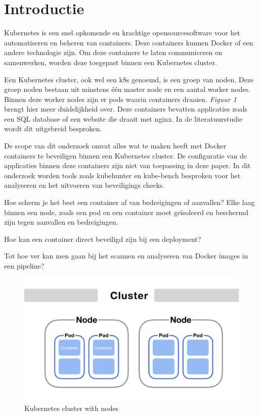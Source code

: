 
\section{Introductie}%
\label{sec:introductie}

Kubernetes is een snel opkomende en krachtige opensourcesoftware voor het automatiseren en beheren van containers. Deze containers kunnen Docker of een andere technologie zijn. Om deze containers te laten communiceren en samenwerken, worden deze toegepast binnen een Kubernetes cluster. 

Een Kubernetes cluster, ook wel een k8s genoemd, is een groep van noden. Deze groep noden bestaan uit minstens één master node en een aantal worker nodes. Binnen deze worker nodes zijn er pods waarin containers draaien. \textit{Figuur 1} brengt hier meer duidelijkheid over. Deze containers bevatten applicaties zoals een SQL database of een website die draait met nginx. In de literatuurstudie wordt dit uitgebreid besproken.

De scope van dit onderzoek omvat alles wat te maken heeft met Docker containers te beveiligen binnen een Kubernetes cluster. De configuratie van de applicaties binnen deze containers zijn niet van toepassing in deze paper. In dit onderzoek worden tools zoals kubehunter en kube-bench besproken voor het analyseren en het uitvoeren van beveiligings checks. 


Hoe scherm je het best een container af van bedreigingen of aanvallen? Elke laag binnen een node, zoals een pod en een container moet geïsoleerd en beschermd zijn tegen aanvallen en bedreigingen.

Hoe kan een container direct beveiligd zijn bij een deployment?

Tot hoe ver kan men gaan bij het scannen en analyseren van Docker images in een pipeline?

\begin{flushleft}
    \begin{figure}[h]
        \includegraphics[width=.49\textwidth]{img/node-overview.png}
        \caption{\label{fig:Kubernetes 4c}Kubernetes cluster with nodes \autocite{kubernetes-MP}}
    \end{figure} 
\end{flushleft}

